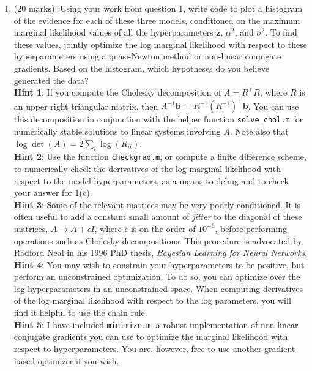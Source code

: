 \documentclass[11pt]{article}
\newcommand{\mbf}[1]{{\boldsymbol{\mathbf{#1}}}}
\renewcommand{\bm}{\mbf}
\begin{document}
\begin{enumerate}
\vspace{2mm}
\begin{enumerate}
\item (20 marks): Using your work from question 1, write code to plot a histogram of the evidence for each of these three models, conditioned on the maximum marginal likelihood values of all the hyperparameters $\bm{z}$, $\alpha^2$, and $\sigma^2$. To find these values, jointly optimize the log marginal likelihood with respect to these hyperparameters using a quasi-Newton method or non-linear conjugate gradients.  Based on the histogram, which hypotheses do you believe generated the data?  \\ 
\textbf{Hint 1}: If you compute the Cholesky decomposition of $A = R^{\top} R$, where $R$ is an upper right triangular matrix, then 
$A^{-1}\bm{b}$ = $R^{-1}(R^{-1})^{\top} \bm{b}$.  You can use this decomposition in conjunction with the helper function \texttt{solve\_chol.m} for numerically stable solutions to linear systems involving $A$.  
Note also that $\log \det(A) = 2 \sum_i \log(R_{ii})$. \\
\textbf{Hint 2}: Use the function \texttt{checkgrad.m}, or compute a finite difference scheme, to numerically check the derivatives of the log marginal likelihood with respect to the model hyperparameters, as a means to debug and to check your answer for 1(c). \\
\textbf{Hint 3}: Some of the relevant matrices may be very poorly conditioned.  It is often useful to add a constant small amount of \emph{jitter} to the diagonal of these matrices, $A \to A + \epsilon I$, where $\epsilon$ is on the order of $10^{-6}$, before performing operations such as Cholesky decompositions. This procedure is advocated by Radford Neal in his 1996 PhD thesis, \emph{Bayesian Learning for Neural Networks}. \\
\textbf{Hint 4}: You may wish to constrain your hyperparameters to be positive, but perform an unconstrained optimization.  To do so, you can optimize over the log hyperparameters in an unconstrained space.  When computing derivatives of the log marginal likelihood with respect to the log parameters, you will find it helpful to use the chain rule.\\
\textbf{Hint 5}: I have included \texttt{minimize.m}, a robust implementation of non-linear conjugate gradients you can use to optimize the marginal likelihood with respect to hyperparameters.  You are, however, free to use another gradient based optimizer if you wish.


\end{enumerate}
\end{enumerate}
\end{document}
